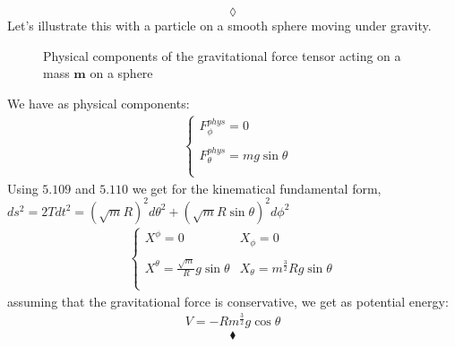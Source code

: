 $$\lozenge$$
Let's illustrate this with a particle on a smooth sphere moving under gravity.
\begin{figure}[H]

\caption{Physical components of the gravitational force tensor acting on a mass $\mathbf{m}$ on a sphere }
\label{fig:fig_p186_Ex2}
\end{figure}
We have as physical components:
\begin{align}
&\left\{\begin{array}{l}
F_{\phi}^{phys}= 0\\\\
F_{\theta}^{phys}= mg\sin{\theta}\\\\
\end{array}\right.
\end{align}
Using $\mathbf{5.109}$ and $\mathbf{5.110}$ we get for the kinematical fundamental form, $ds^2= 2Tdt^2 = \left(\sqrt{m}R\right)^2d\theta^2 + \left(\sqrt{m}R\sin\theta\right)^2d\phi^2 $
\begin{align}
\left\{\begin{array}{ll}
X^{\phi}= 0&X_{\phi}= 0\\\\
X^{\theta}= \frac{\sqrt{m}}{R}g\sin{\theta}&X_{\theta}= m{^\frac{3}{2}}R  g\sin{\theta}\\\\
\end{array}\right.
\end{align}
assuming that the gravitational force is conservative, we get as potential energy:
\begin{align}
V = -R m{^\frac{3}{2}} g\cos{\theta}
\end{align}
$$\blacklozenge$$
\newpage

